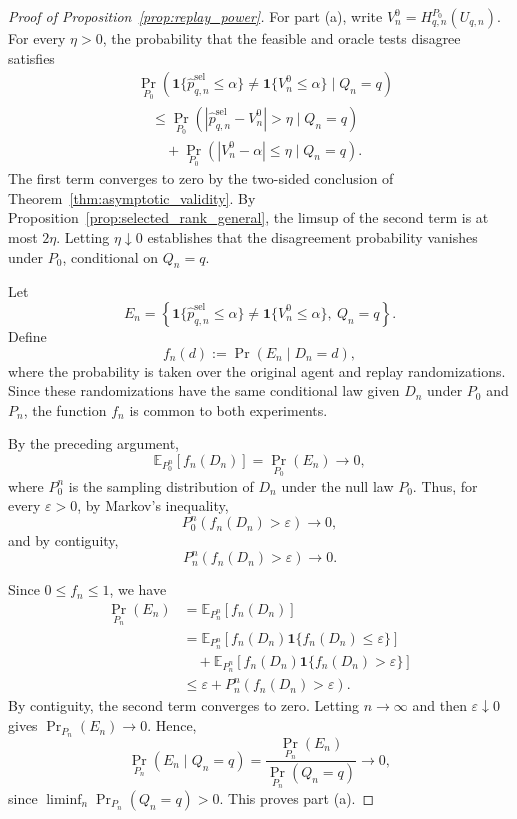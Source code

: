 \documentclass[10pt]{article}
\newcommand{\E}{\mathbb{E}}
\begin{document}
\begin{proof}[Proof of Proposition~\ref{prop:replay_power}]
For part (a), write
$V_n^0=H_{q,n}^{P_0}(U_{q,n})$.
For every $\eta>0$, the probability that the
feasible and oracle tests disagree satisfies
\[
\begin{aligned}
&\Pr_{P_0}\left(
\mathbf{1}\{\widehat p_{q,n}^{\mathrm{sel}}\le\alpha\}
\neq\mathbf{1}\{V_n^0\le\alpha\}
\mid Q_n=q\right)\\
&\quad\le
\Pr_{P_0}\left(
|\widehat p_{q,n}^{\mathrm{sel}}-V_n^0|>\eta
\mid Q_n=q\right)\\
&\qquad+
\Pr_{P_0}\left(
|V_n^0-\alpha|\le\eta
\mid Q_n=q\right).
\end{aligned}
\]
The first term converges to zero by the
two-sided conclusion of
Theorem~\ref{thm:asymptotic_validity}.
By Proposition~\ref{prop:selected_rank_general},
the limsup of the second term is at most $2\eta$.
Letting $\eta\downarrow0$ establishes that the
disagreement probability vanishes under $P_0$,
conditional on $Q_n=q$.

Let
\[
E_n=
\left\{
\mathbf{1}\{\widehat p_{q,n}^{\mathrm{sel}}\le\alpha\}
\neq
\mathbf{1}\{V_n^0\le\alpha\},
\ Q_n=q
\right\}.
\]
Define
\[
f_n(d):=\Pr(E_n\mid D_n=d),
\]
where the probability is taken over the original
agent and replay randomizations. Since these
randomizations have the same conditional law
given $D_n$ under $P_0$ and $P_n$, the function
$f_n$ is common to both experiments.

By the preceding argument,
\[
\E_{P_0^n}[f_n(D_n)]
=\Pr_{P_0}(E_n)\longrightarrow0,
\]
where $P_0^n$ is the sampling distribution of $D_n$ under the null law $P_0$.
Thus, for every $\varepsilon>0$, by Markov's inequality,
\[
P_0^n(f_n(D_n)>\varepsilon)
\longrightarrow0,
\]
and by contiguity,
\[
P_n^n(f_n(D_n)>\varepsilon)
\longrightarrow0.
\]

Since $0\le f_n\le1$, we have
\[
\begin{aligned}
\Pr_{P_n}(E_n)
&=\E_{P_n^n}[f_n(D_n)]\\
&=\E_{P_n^n}\left[
f_n(D_n)\mathbf{1}\{f_n(D_n)\le\varepsilon\}
\right]\\
&\quad+\E_{P_n^n}\left[
f_n(D_n)\mathbf{1}\{f_n(D_n)>\varepsilon\}
\right]\\
&\le\varepsilon+
P_n^n(f_n(D_n)>\varepsilon).
\end{aligned}
\]
By contiguity, the second term converges to zero.
Letting $n\to\infty$ and then
$\varepsilon\downarrow0$ gives
$\Pr_{P_n}(E_n)\to0$.
 Hence,
\[
\Pr_{P_n}(E_n\mid Q_n=q)
=
\frac{\Pr_{P_n}(E_n)}
{\Pr_{P_n}(Q_n=q)}
\longrightarrow0,
\]
since $\liminf_n\Pr_{P_n}(Q_n=q)>0$. This proves part (a).


\end{proof}
\end{document}
